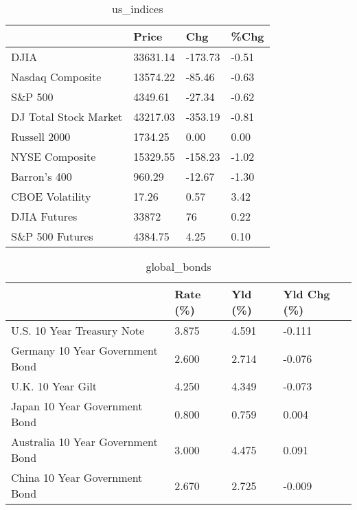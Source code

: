 \documentclass{article}%
\begin{document}
%


\begin{table}[htbp]%
\caption{us\_indices}%
\centering%
\begin{adjustbox}{width=1\textwidth}%
\begin{tabular}{llll}
\toprule
                      &    Price &     Chg &  \%Chg \\
\midrule
                 DJIA & 33631.14 & -173.73 & -0.51 \\
     Nasdaq Composite & 13574.22 &  -85.46 & -0.63 \\
              S\&P 500 &  4349.61 &  -27.34 & -0.62 \\
DJ Total Stock Market & 43217.03 & -353.19 & -0.81 \\
         Russell 2000 &  1734.25 &    0.00 &  0.00 \\
       NYSE Composite & 15329.55 & -158.23 & -1.02 \\
         Barron's 400 &   960.29 &  -12.67 & -1.30 \\
      CBOE Volatility &    17.26 &    0.57 &  3.42 \\
         DJIA Futures &    33872 &      76 &  0.22 \\
      S\&P 500 Futures &  4384.75 &    4.25 &  0.10 \\
\bottomrule
\end{tabular}
%
\end{adjustbox}%
\end{table}

%


\begin{table}[htbp]%
\caption{global\_bonds}%
\centering%
\begin{adjustbox}{width=1\textwidth}%
\begin{tabular}{llll}
\toprule
                                  & Rate (\%) & Yld (\%) & Yld Chg (\%) \\
\midrule
       U.S. 10 Year Treasury Note &    3.875 &   4.591 &      -0.111 \\
  Germany 10 Year Government Bond &    2.600 &   2.714 &      -0.076 \\
                U.K. 10 Year Gilt &    4.250 &   4.349 &      -0.073 \\
    Japan 10 Year Government Bond &    0.800 &   0.759 &       0.004 \\
Australia 10 Year Government Bond &    3.000 &   4.475 &       0.091 \\
    China 10 Year Government Bond &    2.670 &   2.725 &      -0.009 \\
\bottomrule
\end{tabular}
%
\end{adjustbox}%
\end{table}
\end{document}
